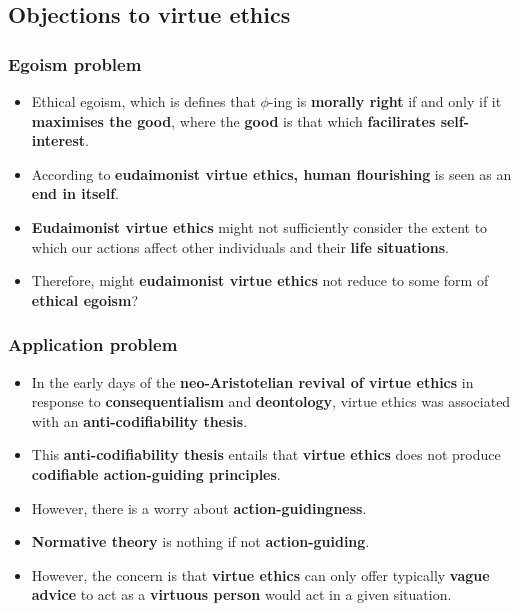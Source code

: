 \documentclass[11pt]{article}
\begin{document}
\subsection{Objections to virtue ethics}
\label{sec:org137e54b}

\subsubsection{Egoism problem}
\label{sec:orgcbe0f26}
\begin{itemize}
\item Ethical egoism, which is defines that \(\phi\)-ing is \textbf{morally right} if and only if it \textbf{maximises the good}, where the \textbf{good} is that which \textbf{facilirates self-interest}.
\item According to \textbf{eudaimonist virtue ethics, human flourishing} is seen as an \textbf{end in itself}.
\item \textbf{Eudaimonist virtue ethics} might not sufficiently consider the extent to which our actions affect other individuals and their \textbf{life situations}.
\item Therefore, might \textbf{eudaimonist virtue ethics} not reduce to some form of \textbf{ethical egoism}?
\end{itemize}
\subsubsection{Application problem}
\label{sec:org4ce21ff}
\begin{itemize}
\item In the early days of the \textbf{neo-Aristotelian revival of virtue ethics} in response to \textbf{consequentialism} and \textbf{deontology}, virtue ethics was associated with an \textbf{anti-codifiability thesis}.
\item This \textbf{anti-codifiability thesis} entails that \textbf{virtue ethics} does not produce \textbf{codifiable action-guiding principles}.
\item However, there is a worry about \textbf{action-guidingness}.
\item \textbf{Normative theory} is nothing if not \textbf{action-guiding}.
\item However, the concern is that \textbf{virtue ethics} can only offer typically \textbf{vague advice} to act as a \textbf{virtuous person} would act in a given situation.
\end{itemize}

 \newpage
\end{document}
